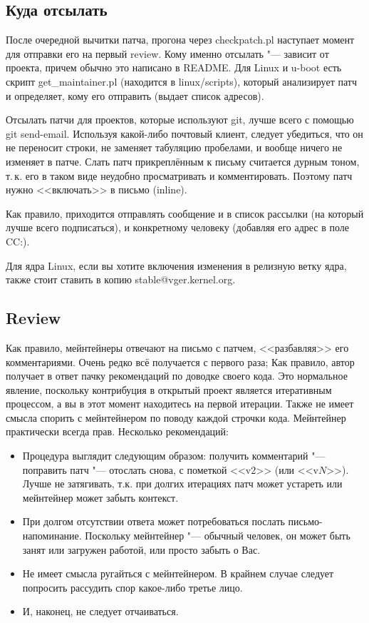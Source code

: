 \documentclass[10pt, a5paper]{article}
\begin{document}
\subsection*{Куда отсылать}

После очередной вычитки патча, прогона через checkpatch.pl наступает момент для отправки его на первый review. Кому именно отсылать "--- зависит от проекта, причем обычно это написано в README. Для Linux и u-boot есть скрипт get\_maintainer.pl (находится в linux/scripts), который анализирует патч и определяет, кому его отправить (выдает список адресов).

Отсылать патчи для проектов, которые используют git, лучше всего с помощью git send-email. Используя какой-либо почтовый клиент, следует убедиться, что он не переносит строки, не заменяет табуляцию пробелами, и вообще ничего не изменяет в патче. Слать патч прикреплённым к письму считается дурным тоном, т.\,к. его в таком виде неудобно просматривать и комментировать. Поэтому патч нужно <<включать>> в письмо (inline).

Как правило, приходится отправлять сообщение и в список рассылки (на который лучше всего подписаться), и конкретному человеку (добавляя его адрес в поле CC:).

Для ядра Linux, если вы хотите включения изменения в релизную ветку ядра, также стоит ставить в копию stable@vger.kernel.org.

\subsection*{Review}

Как правило, мейнтейнеры отвечают на письмо с патчем, <<разбавляя>> его комментариями. Очень редко всё получается с первого раза; Как правило, автор получает в ответ пачку рекомендаций по доводке своего кода. Это нормальное явление, поскольку контрибуция в открытый проект является итеративным процессом, а вы в этот момент находитесь на первой итерации. Также не имеет смысла спорить с мейнтейнером по поводу каждой строчки кода. Мейнтейнер практически всегда прав. Несколько рекомендаций:

\begin{itemize}
    \item Процедура выглядит следующим образом: получить комментарий "--- поправить патч "--- отослать снова, с пометкой <<v2>> \linebreak  (или  <<v$N$>>). Лучше не затягивать, т.к. при долгих итерациях патч может устареть или мейнтейнер может забыть контекст.
    \item При долгом отсутствии ответа может потребоваться послать письмо-напоминание. Поскольку мейнтейнер "--- обычный человек, он может быть занят или загружен работой, или просто забыть о Вас.
    \item Не имеет смысла ругайться с мейнтейнером. В крайнем случае следует попросить рассудить спор какое-либо третье лицо.
    \item И, наконец, не следует отчаиваться.
\end{itemize}
\end{document}
